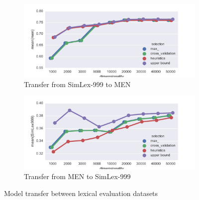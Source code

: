 \begin{figure}
  \centering

  \begin{subfigure}[t]{0.49\textwidth}
    \includegraphics[width=\textwidth]{supplement/figures/SimLex999-transfer}
    \caption{Transfer from SimLex-999 to MEN}
    \label{fig:SimLex999-transfer}
  \end{subfigure}
  \begin{subfigure}[t]{0.49\textwidth}
    \includegraphics[width=\textwidth]{supplement/figures/men-transfer}
    \caption{Transfer from MEN to SimLex-999}
    \label{fig:men-transfer}
  \end{subfigure}

  \caption{Model transfer between lexical evaluation datasets}
  \label{fig:lexical-transfer}
\end{figure}

